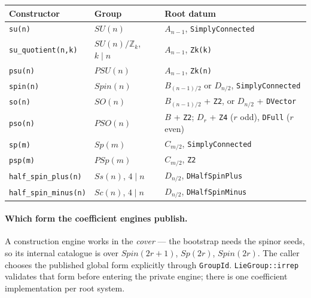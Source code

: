 \documentclass[11pt,a4paper]{article}
\theoremstyle{plain}
\theoremstyle{definition}
\newcommand{\ZZ}{\mathbb{Z}}
\newcommand{\code}[1]{\texttt{#1}}
\begin{document}
\begin{center}
\small
\begin{tabular}{@{}lll@{}}
\toprule
Constructor & Group & Root datum \\
\midrule
\code{su(n)}              & $SU(n)$        & $A_{n-1}$, \code{SimplyConnected} \\
\code{su\_quotient(n,k)}  & $SU(n)/\ZZ_k$, $k\mid n$ & $A_{n-1}$, \code{Zk(k)} \\
\code{psu(n)}             & $PSU(n)$       & $A_{n-1}$, \code{Zk(n)} \\
\code{spin(n)}            & $Spin(n)$      & $B_{(n-1)/2}$ or $D_{n/2}$, \code{SimplyConnected} \\
\code{so(n)}              & $SO(n)$        & $B_{(n-1)/2}$ + \code{Z2}, or $D_{n/2}$ + \code{DVector} \\
\code{pso(n)}             & $PSO(n)$       & $B$ + \code{Z2}; $D_r$ + \code{Z4} ($r$ odd), \code{DFull} ($r$ even) \\
\code{sp(m)}              & $Sp(m)$        & $C_{m/2}$, \code{SimplyConnected} \\
\code{psp(m)}              & $PSp(m)$       & $C_{m/2}$, \code{Z2} \\
\code{half\_spin\_plus(n)}  & $Ss(n)$, $4\mid n$ & $D_{n/2}$, \code{DHalfSpinPlus} \\
\code{half\_spin\_minus(n)} & $Sc(n)$, $4\mid n$ & $D_{n/2}$, \code{DHalfSpinMinus} \\
\bottomrule
\end{tabular}
\end{center}

\begin{sloppypar}
\paragraph{Which form the coefficient engines publish.} A construction engine
works in the \emph{cover} --- the bootstrap needs the spinor seeds, so its
internal catalogue is over $Spin(2r+1)$, $Sp(2r)$, $Spin(2r)$.
The caller chooses the published global form explicitly through \code{GroupId}.
\code{LieGroup::irrep} validates that form before entering the private engine;
there is one coefficient implementation per root system.
\end{sloppypar}
\end{document}
